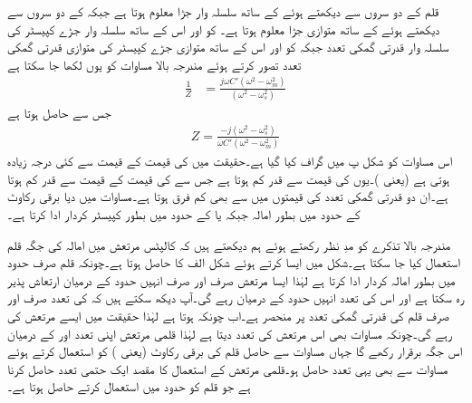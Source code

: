 قلم کے دو سروں سے دیکھتے ہوئے  کے ساتھ  سلسلہ وار جڑا معلوم ہوتا ہے جبکہ  کے دو سروں سے دیکھتے ہوئے  کے ساتھ  متوازی جڑا معلوم ہوتا ہے۔ کو  اور اس کے ساتھ سلسلہ وار جڑے کپیسٹر  کی سلسلہ وار قدرتی گمکی تعدد جبکہ   کو  اور اس کے ساتھ متوازی جڑے کپیسٹر  کی متوازی قدرتی گمکی تعدد تصور کرتے ہوئے مندرجہ بالا مساوات کو یوں لکھا جا سکتا ہے
\begin{align*}
\frac{1}{Z}&=\frac{j \omega C'  \left(\omega^2 -\omega_m^2 \right)}{\left(\omega^2 -\omega_s^2 \right)}
\end{align*}
جس سے حاصل ہوتا ہے
\begin{align} \label{مساوات_مرتعش_قلم_رکاوٹ}
Z=\frac{-j \left(\omega^2 -\omega_s^2 \right)}{\omega C'  \left(\omega^2 -\omega_m^2 \right)}
\end{align}
اس مساوات کو شکل  پ میں گراف کیا گیا ہے۔حقیقت میں  کی قیمت  کے قیمت سے کئی درجہ زیادہ ہوتی ہے (یعنی )۔یوں  کی قیمت  سے قدر کم  ہوتا ہے جس سے  کی قیمت  کے قیمت سے قدر کم ہوتا ہے۔ان دو قدرتی گمکی تعدد کی قیمتوں میں  سے بھی کم فرق ہوتا ہے۔مساوات  میں دیا برقی رکاوٹ  کے حدود میں بطور امالہ جبکہ  یا  کے حدود میں بطور کپیسٹر  کردار ادا کرتا ہے۔

مندرجہ بالا تذکرے کو مدِ نظر رکھتے ہوئے ہم دیکھتے ہیں کہ کالپٹس مرتعش میں امالہ کی جگہ قلم استعمال کیا جا سکتا ہے۔شکل  میں ایسا کرتے ہوئے  شکل  الف کا  حاصل ہوتا ہے۔چونکہ قلم صرف  حدود میں بطور امالہ کردار ادا کرتا ہے لہٰذا ایسا مرتعش صرف اور صرف انہیں حدود کے درمیان ارتعاش پذیر رہ سکتا ہے اور اس کی تعدد انہیں حدود کے درمیان رہے گی۔آپ دیکھ سکتے ہیں کہ  کی تعدد صرف اور صرف قلم کی قدرتی گمکی تعدد پر منحصر ہے۔اب چونکہ  ہوتا ہے لہٰذا حقیقت میں ایسے مرتعش کی   رہے گی۔چونکہ مساوات  بھی اس مرتعش کی تعدد دیتا ہے لہٰذا قلمی مرتعش اپنی تعدد  اور  کے درمیان اس جگہ برقرار رکھے گا جہاں مساوات  سے حاصل قلم کی  برقی رکاوٹ (یعنی ) کو استعمال کرتے ہوئے مساوات  سے بھی یہی تعدد حاصل ہو۔قلمی مرتعش کے استعمال کا مقصد ایک حتمی تعدد حاصل کرنا ہے جو قلم کو  حدود میں استعمال کرتے حاصل ہوتا ہے۔

